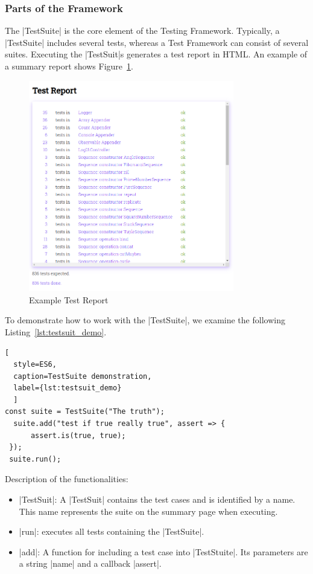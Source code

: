 \subsubsection{Parts of the Framework}
\label{subsub:Parts of the Framework}
The |TestSuite| is the core element of the Testing Framework. Typically, a
|TestSuite| includes several tests, whereas a Test Framework can consist of
several suites. Executing the |TestSuit|s generates a test report in HTML.
An example of a summary report shows Figure~\ref{fig:test_report}.

\begin{figure}[H]
    \centering
    \includegraphics[width=0.8\textwidth]{mainmatter/pictures/test_report.png}
    \caption{Example Test Report}
    \label{fig:test_report}
\end{figure}


To demonstrate how to work with the |TestSuite|, we examine the following Listing~\ref{lst:testsuit_demo}.

\begin{lstlisting}[
  style=ES6, 
  caption=TestSuite demonstration,
  label={lst:testsuit_demo}
  ]
const suite = TestSuite("The truth");
  suite.add("test if true really true", assert => {
      assert.is(true, true);
 });
 suite.run();
\end{lstlisting}

Description of the functionalities: 

\begin{itemize}
  \item{|TestSuit|: A |TestSuit| contains the test cases and is identified by a
    name. This name represents the suite on the summary page when executing.}
  \item{|run|: executes all tests containing the |TestSuite|.}
  \item{|add|: A function for including a test case into |TestStuite|. Its
      parameters are a string |name| and a callback |assert|.}
\end{itemize}


